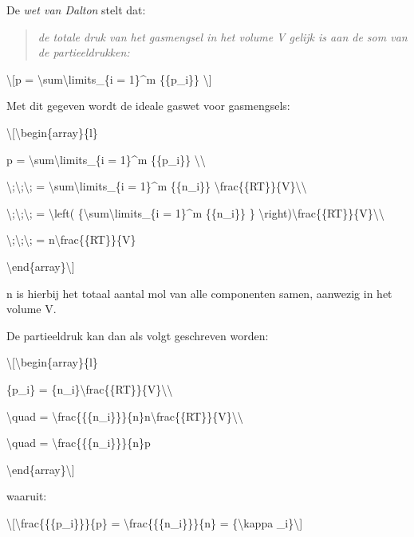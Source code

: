 \documentclass[]{article}
\begin{document}
De \emph{wet van Dalton} stelt dat:

\begin{quote}
\emph{de totale druk van het gasmengsel in het volume V gelijk is aan de
som van de partieeldrukken:}
\end{quote}

\textbackslash{}{[}p = \textbackslash{}sum\textbackslash{}limits\_\{i =
1\}\^{}m \{\{p\_i\}\} \textbackslash{}{]}

Met dit gegeven wordt de ideale gaswet voor gasmengsels:

\textbackslash{}{[}\textbackslash{}begin\{array\}\{l\}

p = \textbackslash{}sum\textbackslash{}limits\_\{i = 1\}\^{}m
\{\{p\_i\}\} \textbackslash{}\textbackslash{}

\textbackslash{};\textbackslash{};\textbackslash{}; =
\textbackslash{}sum\textbackslash{}limits\_\{i = 1\}\^{}m \{\{n\_i\}\}
\textbackslash{}frac\{\{RT\}\}\{V\}\textbackslash{}\textbackslash{}

\textbackslash{};\textbackslash{};\textbackslash{}; =
\textbackslash{}left( \{\textbackslash{}sum\textbackslash{}limits\_\{i =
1\}\^{}m \{\{n\_i\}\} \}
\textbackslash{}right)\textbackslash{}frac\{\{RT\}\}\{V\}\textbackslash{}\textbackslash{}

\textbackslash{};\textbackslash{};\textbackslash{}; =
n\textbackslash{}frac\{\{RT\}\}\{V\}

\textbackslash{}end\{array\}\textbackslash{}{]}

n is hierbij het totaal aantal mol van alle componenten samen, aanwezig
in het volume V.

De partieeldruk kan dan als volgt geschreven worden:

\textbackslash{}{[}\textbackslash{}begin\{array\}\{l\}

\{p\_i\} =
\{n\_i\}\textbackslash{}frac\{\{RT\}\}\{V\}\textbackslash{}\textbackslash{}

\textbackslash{}quad =
\textbackslash{}frac\{\{\{n\_i\}\}\}\{n\}n\textbackslash{}frac\{\{RT\}\}\{V\}\textbackslash{}\textbackslash{}

\textbackslash{}quad = \textbackslash{}frac\{\{\{n\_i\}\}\}\{n\}p

\textbackslash{}end\{array\}\textbackslash{}{]}

waaruit:

\textbackslash{}{[}\textbackslash{}frac\{\{\{p\_i\}\}\}\{p\} =
\textbackslash{}frac\{\{\{n\_i\}\}\}\{n\} = \{\textbackslash{}kappa
\_i\}\textbackslash{}{]}
\end{document}
